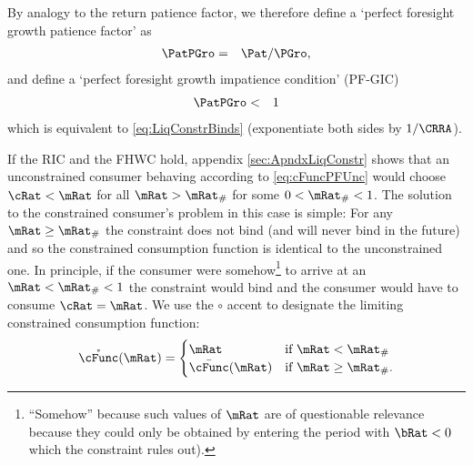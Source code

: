 \documentclass[titlepage]{\econtex}\providecommand{\texname}{BufferStockTheory}%
\begin{document}
By analogy to the return patience factor, we therefore define a `perfect
foresight growth patience factor' as
\begin{eqnarray}
  \PatPGro & = & {\Pat}/\PGro,  \label{eq:PFGPF}
\end{eqnarray}
and define a `perfect foresight growth impatience condition' (PF-GIC)
\begin{eqnarray}
  \label{eq:PFGIC}
  \PatPGro &  < &  1
\end{eqnarray}
which is equivalent to \eqref{eq:LiqConstrBinds} (exponentiate both
sides by $1/\CRRA$).

If the RIC and the FHWC hold, appendix \ref{sec:ApndxLiqConstr} shows
that an unconstrained consumer behaving according to
\eqref{eq:cFuncPFUnc} would choose $\cRat < \mRat$ for all $\mRat >
\mRat_{\#}$ for some $0 < \mRat_{\#} < 1$.  The solution to the
constrained consumer's problem in this case is simple: For any $\mRat
\geq \mRat_{\#}$ the constraint does not bind (and will never bind in
the future) and so the constrained consumption function is identical
to the unconstrained one.  In principle, if the consumer were somehow\footnote{``Somehow'' because such values
of $\mRat$ are of questionable relevance because they could only be
obtained by entering the period with $\bRat < 0$ which the constraint
rules out).}
to arrive at an $\mRat < \mRat_{\#} < 1$ the constraint would bind and
the consumer would have to consume $\cRat=\mRat$.  We use the $\circ$ accent to designate the limiting
constrained consumption function:
\begin{equation}
\mathring{\cFunc}(\mRat)=
\begin{cases}
 \mRat & \text{if $\mRat < \mRat_{\#}$} \\
 \bar{\cFunc}(\mRat)  & \text{if $\mRat \geq \mRat_{\#}$.}
\end{cases}
\end{equation}
\end{document}
